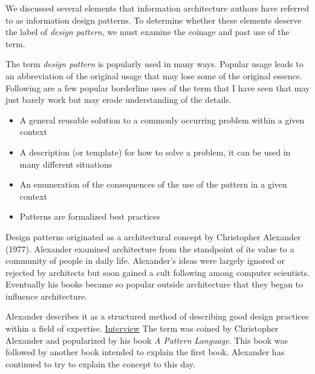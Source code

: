We discussed several elements that information architecture authors have
referred to as information design patterns. To determine whether these
elements deserve the label of \emph{design pattern}, we must examine the
coinage and past use of the term.

\hypertarget{design-pattern-definitions}{%
\label{design-pattern-definitions}}

The term \emph{design pattern} is popularly used in many ways. Popular
usage leads to an abbreviation of the original usage that may lose some
of the original essence. Following are a few popular borderline uses of
the term that I have seen that may just barely work but may erode
understanding of the details.

\begin{itemize}
\tightlist
\item
  A general reusable solution to a commonly occurring problem within a
  given context
\item
  A description (or template) for how to solve a problem, it can be used
  in many different situations
\item
  An enumeration of the consequences of the use of the pattern in a
  given context
\item
  Patterns are formalized best practices
\end{itemize}

\hypertarget{design-patterns-were-first-observed}{%
\label{design-patterns-were-first-observed}}

Design patterns originated as a architectural concept by Christopher
Alexander (1977). Alexander examined architecture from the standpoint of
its value to a community of people in daily life. Alexander's ideas were
largely ignored or rejected by architects but soon gained a cult
following among computer scientists. Eventually his books became so
popular outside architecture that they began to influence architecture.

\hypertarget{a-pattern-language}{%
\label{a-pattern-language}}

Alexander describes it as a structured method of describing good design
practices within a field of expertise.
\href{http://www.youtube.com/watch?v=ad5XAPgKJoM}{Interview} The term
was coined by Christopher Alexander and popularized by his book \emph{A
Pattern Language}. This book was followed by another book intended to
explain the first book. Alexander has continued to try to explain the
concept to this day.

